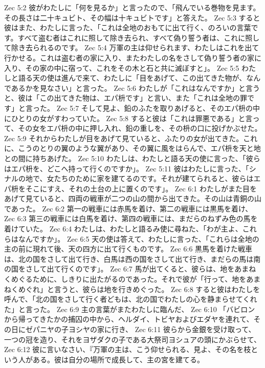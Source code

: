 Zec 5:2  彼がわたしに「何を見るか」と言ったので、「飛んでいる巻物を見ます。その長さは二十キュビト、その幅は十キュビトです」と答えた。
Zec 5:3  すると彼はまた、わたしに言った、「これは全地のおもてに出て行く、のろいの言葉です。すべて盗む者はこれに照して除き去られ、すべて偽り誓う者は、これに照して除き去られるのです。
Zec 5:4  万軍の主は仰せられます、わたしはこれを出て行かせる。これは盗む者の家に入り、またわたしの名をさして偽り誓う者の家に入り、その家の中に宿って、これをその木と石と共に滅ぼすと」。
Zec 5:5  わたしと語る天の使は進んで来て、わたしに「目をあげて、この出てきた物が、なんであるかを見なさい」と言った。
Zec 5:6  わたしが「これはなんですか」と言うと、彼は「この出てきた物は、エパ枡です」と言い、また「これは全地の罪です」と言った。
Zec 5:7  そして見よ、鉛のふたを取りあげると、そのエパ枡の中にひとりの女がすわっていた。
Zec 5:8  すると彼は「これは罪悪である」と言って、その女をエパ枡の中に押し入れ、鉛の重しを、その枡の口に投げかぶせた。
Zec 5:9  それからわたしが目をあげて見ていると、ふたりの女が出てきた。これに、こうのとりの翼のような翼があり、その翼に風をはらんで、エパ枡を天と地との間に持ちあげた。
Zec 5:10  わたしは、わたしと語る天の使に言った、「彼らはエパ枡を、どこへ持って行くのですか」。
Zec 5:11  彼はわたしに言った、「シナルの地で、女たちのために家を建てるのです。それが建てられると、彼らはエパ枡をそこにすえ、それの土台の上に置くのです」。
Zec 6:1  わたしがまた目をあげて見ていると、四両の戦車が二つの山の間から出てきた。その山は青銅の山であった。
Zec 6:2  第一の戦車には赤馬を着け、第二の戦車には黒馬を着け、
Zec 6:3  第三の戦車には白馬を着け、第四の戦車には、まだらのねずみ色の馬を着けていた。
Zec 6:4  わたしは、わたしと語るみ使に尋ねた、「わが主よ、これらはなんですか」。
Zec 6:5  天の使は答えて、わたしに言った、「これらは全地の主の前に現れて後、天の四方に出て行くものです。
Zec 6:6  黒馬を着けた戦車は、北の国をさして出て行き、白馬は西の国をさして出て行き、まだらの馬は南の国をさして出て行くのです」。
Zec 6:7  馬が出てくると、彼らは、地をあまねくめぐるために、しきりに出たがるのであった。それで彼が「行って、地をあまねくめぐれ」と言うと、彼らは地を行きめぐった。
Zec 6:8  すると彼はわたしを呼んで、「北の国をさして行く者どもは、北の国でわたしの心を静まらせてくれた」と言った。
Zec 6:9  主の言葉がまたわたしに臨んだ、
Zec 6:10  「バビロンから帰ってきたかの捕囚の中から、ヘルダイ、トビヤおよびエダヤを連れて、その日にゼパニヤの子ヨシヤの家に行き、
Zec 6:11  彼らから金銀を受け取って、一つの冠を造り、それをヨザダクの子である大祭司ヨシュアの頭にかぶらせて、
Zec 6:12  彼に言いなさい、『万軍の主は、こう仰せられる、見よ、その名を枝という人がある。彼は自分の場所で成長して、主の宮を建てる。
